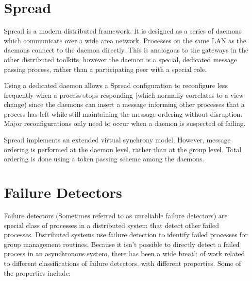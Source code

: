 \section{Spread}

Spread\cite{SPREADTOOLKIT} is a modern distributed framework. It is designed as a series of daemons which communicate over a wide area network. Processes on the same LAN as the daemons connect to the daemon directly. This is analogous to the gateways in the other distributed toolkits, however the daemon is a special, dedicated message passing process, rather than a participating peer with a special role.

Using a dedicated daemon allows a Spread configuration to reconfigure less frequently when a process stops responding (which normally correlates to a view change) since the daemons can insert a message informing other processes that a process has left while still maintaining the message ordering without disruption. Major reconfigurations only need to occur when a daemon is suspected of failing.

Spread implements an extended virtual synchrony model. However, message ordering is performed at the daemon level, rather than at the group level. Total ordering is done using a token passing scheme among the daemons.

\section{Failure Detectors}

Failure detectors \cite{FAILUREDETECTORS} (Sometimes referred to as unreliable failure detectors) are special class of processes in a distributed system that detect other failed processes. Distributed systems use failure detection to identify failed processes for group management routines. Because it isn't possible to directly detect a failed process in an asynchronous system, there has been a wide breath of work related to different classifications of failure detectors, with different properties. Some of the properties include\cite{FAILUREDETECTORS}:

